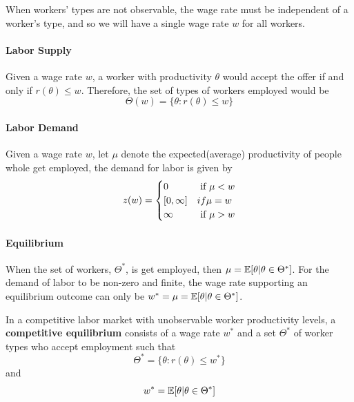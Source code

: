 \documentclass{report}
\begin{document}
		\begin{remark}
			When workers' types are not observable, the wage rate must be independent of a worker's type, and so we will have a single wage rate $w$ for all workers.
		\end{remark}
		
		\paragraph{Labor Supply} Given a wage rate $w$, a worker with productivity $\theta$ would accept the offer if and only if $r(\theta) \leq w$. Therefore, the set of types of workers employed would be 
		\begin{equation}
			\Theta(w) = \{\theta: r(\theta) \leq w\}
		\end{equation}
		
		\paragraph{Labor Demand} Given a wage rate $w$, let $\mu$ denote the expected(average) productivity of people whole get employed, the demand for labor is given by 
		\begin{equation}
			z(w) = \begin{cases}
				0 &\text{{ if }} \mu < w \\
				[0, \infty] &{ if } \mu = w \\
				\infty &\text{{ if }} \mu > w
			\end{cases}
		\end{equation}
		
		\paragraph{Equilibrium} When the set of workers, $\Theta^*$, is get employed, then $\mu = \mathbb{E}[{\theta|\theta \in \Theta^*}]$. For the demand of labor to be non-zero and finite, the wage rate supporting an equilibrium outcome can only be $w^* = \mu = \mathbb{E}[{\theta|\theta \in \Theta^*}]$.
		
		\begin{definition}
			In a competitive labor market with unobservable worker productivity levels, a \textbf{competitive equilibrium} consists of a wage rate $w^*$ and a set $\Theta^*$ of worker types who accept employment such that
			\begin{equation}
				\Theta^* = \{\theta: r(\theta) \leq w^*\}
			\end{equation}
			and 
			\begin{equation}
				w^* = \mathbb{E}[{\theta|\theta \in \Theta^*}]
			\end{equation}
		\end{definition}
		
\end{document}
